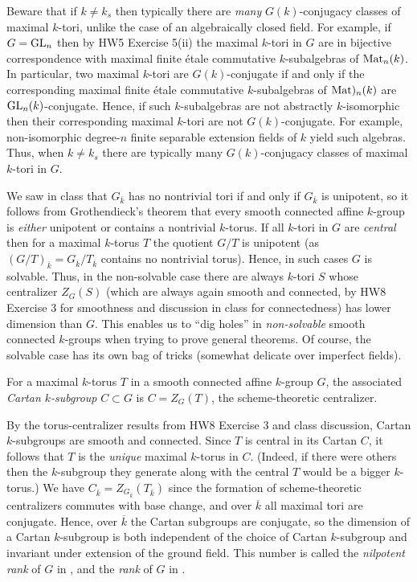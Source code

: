 \documentclass[10pt]{article}
\renewcommand{\(}{\left(}
\renewcommand{\)}{\right)}
\numberwithin{thm}{subsection}
\begin{document}
 Beware that if $k\neq k_s$ then typically there are \textit{many} $G(k)$-conjugacy classes of 
 maximal $k$-tori, unlike the case of an algebraically closed field. For example, 
 if $G = {\rm{GL}}_n$ then by HW5 Exercise 5(ii) the maximal $k$-tori 
in $G$ are in bijective correspondence with maximal 
finite \'etale commutative $k$-subalgebras of ${\rm{Mat}}_n(k)$.  In particular, 
two maximal $k$-tori are $G(k)$-conjugate if and only if the corresponding
maximal finite \'etale commutative $k$-subalgebras of
${\rm{Mat}})_n(k)$ are ${\rm{GL}}_n(k)$-conjugate.  Hence, if such $k$-subalgebras 
are not abstractly $k$-isomorphic then their corresponding maximal $k$-tori are
not $G(k)$-conjugate.  For example, non-isomorphic degree-$n$ finite
separable extension fields of $k$ yield such algebras.  
Thus, when $k \ne k_s$ there are typically many $G(k)$-conjugacy classes 
of maximal $k$-tori in $G$. 

We saw in class that $G_{\overline{k}}$ has no nontrivial tori if and only if $G_{\overline{k}}$ is unipotent,
so it follows from Grothendieck's theorem that every smooth connected affine
$k$-group is {\em either} unipotent or contains a nontrivial $k$-torus.  If all $k$-tori in $G$ are {\em central}
then for a maximal $k$-torus $T$ the quotient $G/T$ is unipotent (as $(G/T)_{\overline{k}} = G_{\overline{k}}/T_{\overline{k}}$
contains no nontrivial torus).  Hence, in such cases $G$ is solvable.  Thus, in the non-solvable case
there are always $k$-tori $S$ whose centralizer $Z_G(S)$ (which are always again smooth and connected, by
HW8 Exercise 3 for smoothness and discussion in class for connectedness)
has lower dimension than $G$.  This enables 
us to ``dig holes'' in {\em non-solvable} smooth connected $k$-groups when trying to prove
general theorems.  Of course, the solvable case has its own bag of tricks (somewhat delicate over
imperfect fields). 

\begin{definition}\label{cartandef}
For a maximal $k$-torus $T$ in a smooth connected affine $k$-group $G$,
the associated {\em Cartan $k$-subgroup} $C\subset G$
is $C=Z_G(T)$, the scheme-theoretic centralizer. 
\end{definition}

By the torus-centralizer results from HW8 Exercise 3 and class discussion, 
Cartan $k$-subgroups are smooth and connected.
Since $T$ is central in its Cartan $C$, it follows that $T$ is the \textit{unique} maximal $k$-torus in $C$.
(Indeed, if there were others then the 
$k$-subgroup they generate along with the central $T$ would be a bigger $k$-torus.)
We have $C_{\overline{k}}=Z_{G_{\overline{k}}}(T_{\overline{k}})$
since the formation of scheme-theoretic centralizers commutes with base change,
and over $\overline{k}$ all maximal tori are conjugate. Hence, 
over $\overline{k}$ the Cartan subgroups 
are conjugate, so the dimension of a Cartan $k$-subgroup
is both independent of the choice of Cartan $k$-subgroup
and invariant under extension of the ground
field.  This number is called the \textit{nilpotent rank} of $G$ in \cite{sga3}, and the {\em rank} of $G$ in \cite{borel}.
\end{document}
